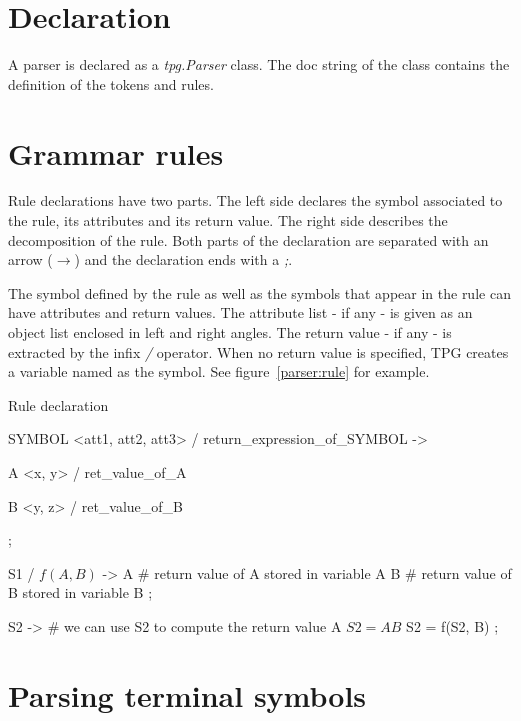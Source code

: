 \section{Declaration}

A parser is declared as a \emph{tpg.Parser} class.
The doc string of the class contains the definition of the tokens and rules.

\section{Grammar rules}                                         \label{parser:grammar_rules}

Rule declarations have two parts.
The left side declares the symbol associated to the rule, its attributes and its return value.
The right side describes the decomposition of the rule.
Both parts of the declaration are separated with an arrow (\emph{$\to$})
and the declaration ends with a \emph{;}.

The symbol defined by the rule as well as the symbols that appear in the rule can have attributes and return values.
The attribute list - if any - is given as an object list enclosed in left and right angles.
The return value - if any - is extracted by the infix \emph{/} operator.
When no return value is specified, TPG creates a variable named as the symbol.
See figure~\ref{parser:rule} for example.

\begin{code}
\caption{Rule declaration}                                      \label{parser:rule}
\begin{verbatimtab}[4]
    SYMBOL <att1, att2, att3> / return_expression_of_SYMBOL ->

        A <x, y> / ret_value_of_A

        B <y, z> / ret_value_of_B

        ;

    S1 / $f(A,B)$ ->
        A       # return value of A stored in variable A
        B       # return value of B stored in variable B
    ;

    S2 ->       # we can use S2 to compute the return value
        A       $ S2 = A
        B       $ S2 = f(S2, B)
    ;
\end{verbatimtab}
\end{code}

\section{Parsing terminal symbols}

